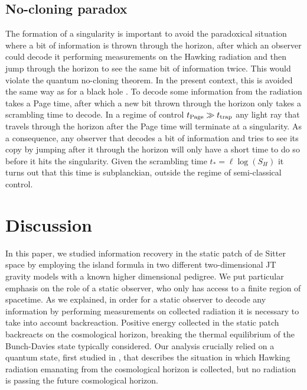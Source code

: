 \documentclass[a4paper,11pt]{article}
\numberwithin{equation}{section}
\begin{document}
\subsection{No-cloning paradox}
%
The formation of a singularity is important to avoid the paradoxical situation where a bit of information is thrown through the horizon, after which an observer could decode it performing measurements on the Hawking radiation and then jump through the horizon to see the same bit of information twice. This would violate the quantum no-cloning theorem. In the present context, this is avoided the same way as for a black hole \cite{Hayden:2007cs,Susskind:1993mu}. To decode some information from the radiation takes a Page time, after which a new bit thrown through the horizon only takes a scrambling time to decode. In a regime of control $t_{\rm Page}\gg t_{\rm trap}$ any light ray that travels through the horizon after the Page time will terminate at a singularity. As a consequence, any observer that decodes a bit of information and tries to see its copy by jumping after it through the horizon will only have a short time to do so before it hits the singularity. Given the scrambling time $t_*=\ell \log(S_H)$ it turns out that this time is subplanckian, outside the regime of semi-classical control.


\section{Discussion} \label{sec:discussion}
%
In this paper, we studied information recovery in the static patch of de Sitter space by employing the island formula in two different two-dimensional JT gravity models with a known higher dimensional pedigree. We put particular emphasis on the role of a static observer, who only has access to a finite region of spacetime. As we explained, in order for a static observer to decode any information by performing measurements on collected radiation it is necessary to take into account backreaction. Positive energy collected in the static patch backreacts on the cosmological horizon, breaking the thermal equilibrium of the Bunch-Davies state typically considered. Our analysis crucially relied on a quantum state, first studied in \cite{Aalsma:2019rpt}, that describes the situation in which Hawking radiation emanating from the cosmological horizon is collected, but no radiation is passing the future cosmological horizon.
\end{document}
